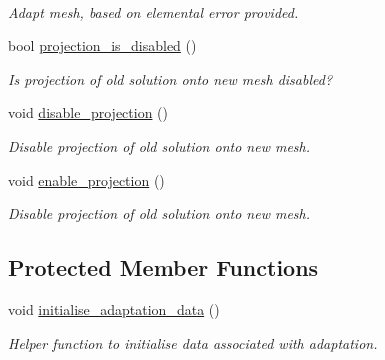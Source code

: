 \begin{DoxyCompactItemize}
$$\begin{DoxyCompactList}\small\item\em Adapt mesh, based on elemental error provided. \end{DoxyCompactList}\item 
bool \hyperlink{classoomph_1_1RefineableTetgenMesh_a3c2bb21844f02403fa687fefc55ba5ad}{projection\+\_\+is\+\_\+disabled} ()
\begin{DoxyCompactList}\small\item\em Is projection of old solution onto new mesh disabled? \end{DoxyCompactList}\item 
void \hyperlink{classoomph_1_1RefineableTetgenMesh_af5342732d4a4e715a443688a53801c00}{disable\+\_\+projection} ()
\begin{DoxyCompactList}\small\item\em Disable projection of old solution onto new mesh. \end{DoxyCompactList}\item 
void \hyperlink{classoomph_1_1RefineableTetgenMesh_a7fabe6ae591918c313213fd0528e21d1}{enable\+\_\+projection} ()
\begin{DoxyCompactList}\small\item\em Disable projection of old solution onto new mesh. \end{DoxyCompactList}\end{DoxyCompactItemize}
\subsection*{Protected Member Functions}
\begin{DoxyCompactItemize}
\item 
void \hyperlink{classoomph_1_1RefineableTetgenMesh_a78ed78a656617d294c73118eda904253}{initialise\+\_\+adaptation\+\_\+data} ()
\begin{DoxyCompactList}\small\item\em Helper function to initialise data associated with adaptation. \end{DoxyCompactList}\end{DoxyCompactItemize}
